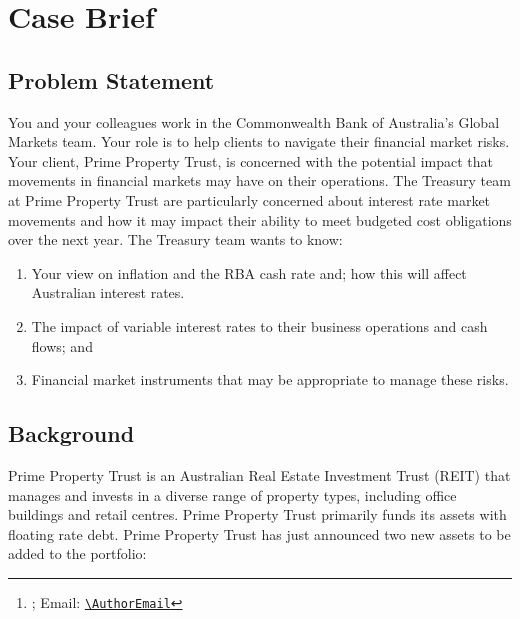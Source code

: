 \documentclass[11pt, a4paper, british]{article}
\title{\PaperTitle}
\author{%
    \AuthorName
    \thanks{\AuthorAffiliation; Email: \href{mailto:\AuthorEmail}{\nolinkurl{\AuthorEmail}}}
}
\date{\today}
\begin{document}
\maketitle
\begin{abstract}
    \noindent
    This is a \LaTeX\ writeup of my progression through a preponderance of alternative hedging strategies
\end{abstract}


\thispagestyle{empty}

\clearpage
\tableofcontents
\listoftables
\listofalgorithms
\thispagestyle{empty}
\clearpage


\section{Case Brief}

\subsection{Problem Statement}
You and your colleagues work in the Commonwealth Bank of Australia's Global Markets team. Your role is to help clients to navigate their financial market risks. Your client, Prime Property Trust, is concerned with the potential impact that movements in financial markets may have on their operations. The Treasury team at Prime Property Trust are particularly concerned about interest rate market movements and how it may impact their ability to meet budgeted cost obligations over the next year. The Treasury team wants to know:

\begin{enumerate}
    \item Your view on inflation and the RBA cash rate and; how this will affect Australian interest rates.
    \item The impact of variable interest rates to their business operations and cash flows; and
    \item Financial market instruments that may be appropriate to manage these risks.
\end{enumerate}

\subsection{Background}
Prime Property Trust is an Australian Real Estate Investment Trust (REIT) that manages and invests in a diverse range of property types, including office buildings and retail centres. Prime Property Trust primarily funds its assets with floating rate debt. Prime Property Trust has just announced two new assets to be added to the portfolio:
\end{document}
